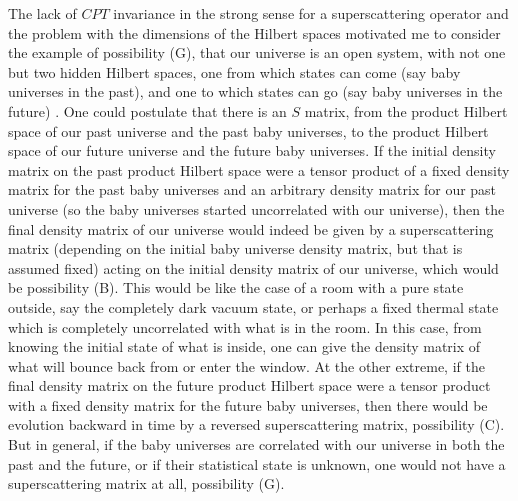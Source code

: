      The lack of $CPT$ invariance in the strong sense for a
superscattering
operator and the problem with the dimensions of the Hilbert spaces
motivated me
to consider the example of possibility (G), that our universe is an
open
system, with not one but two hidden Hilbert spaces, one from which
states can
come (say baby universes in the past), and one to which states can go
(say baby
universes in the future) \cite{Pag82,Pag83}. One could postulate that
there
is
an $S$ matrix, from the product Hilbert space of our past universe
and the past
baby universes, to the product Hilbert space of our future universe
and the
future baby universes.  If the initial density matrix on the past
product
Hilbert space were a tensor product of a fixed density matrix for the
past baby
universes and an arbitrary density matrix for our past universe (so
the baby
universes started uncorrelated with our universe), then the final
density
matrix of our universe would indeed be given by a superscattering
matrix
(depending on the initial baby universe density matrix, but that is
assumed
fixed) acting on the initial density matrix of our universe, which
would be
possibility (B).  This would be like the case of a room with a pure
state
outside, say the completely dark vacuum state, or perhaps a fixed
thermal state
which is completely uncorrelated with what is in the room.  In this
case, from
knowing the initial state of what is inside, one can give the density
matrix of
what will bounce back from or enter the window.  At the other
extreme, if the
final density matrix on the future product Hilbert space were a
tensor product
with a fixed density matrix for the future baby universes, then there
would be
evolution backward in time by a reversed superscattering matrix,
possibility
(C).  But in general, if the baby universes are correlated with our
universe in
both the past and the future, or if their statistical state is
unknown, one
would not have a superscattering matrix at all, possibility (G).

